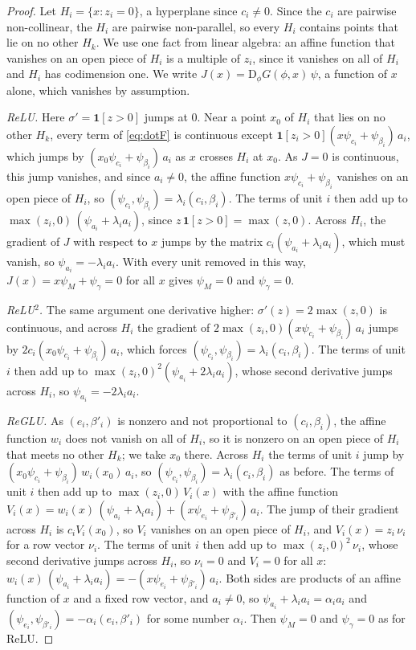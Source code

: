 \documentclass[10pt]{article}
\theoremstyle{definition}
\theoremstyle{remark}
\newcommand{\Der}{\mathrm{D}}
\begin{document}
\begin{proof}
Let $H_i = \{x : z_i = 0\}$, a hyperplane since $c_i \neq 0$. Since the $c_i$ are pairwise non-collinear, the $H_i$ are pairwise non-parallel, so every $H_i$ contains points that lie on no other $H_k$. We use one fact from linear algebra: an affine function that vanishes on an open piece of $H_i$ is a multiple of $z_i$, since it vanishes on all of $H_i$ and $H_i$ has codimension one. We write $J(x) = \Der_\phi G(\phi, x)\,\psi$, a function of $x$ alone, which vanishes by assumption.

\emph{ReLU.} Here $\sigma' = \mathbf 1[z > 0]$ jumps at $0$. Near a point $x_0$ of $H_i$ that lies on no other $H_k$, every term of \cref{eq:dotF} is continuous except $\mathbf 1[z_i > 0](x\psi_{c_i} + \psi_{\beta_i})\,a_i$, which jumps by $(x_0\psi_{c_i} + \psi_{\beta_i})\,a_i$ as $x$ crosses $H_i$ at $x_0$. As $J = 0$ is continuous, this jump vanishes, and since $a_i \neq 0$, the affine function $x\psi_{c_i} + \psi_{\beta_i}$ vanishes on an open piece of $H_i$, so $(\psi_{c_i}, \psi_{\beta_i}) = \lambda_i(c_i, \beta_i)$. The terms of unit $i$ then add up to $\max(z_i, 0)\,(\psi_{a_i} + \lambda_ia_i)$, since $z\,\mathbf 1[z > 0] = \max(z, 0)$. Across $H_i$, the gradient of $J$ with respect to $x$ jumps by the matrix $c_i(\psi_{a_i} + \lambda_ia_i)$, which must vanish, so $\psi_{a_i} = -\lambda_ia_i$. With every unit removed in this way, $J(x) = x\psi_M + \psi_\gamma = 0$ for all $x$ gives $\psi_M = 0$ and $\psi_\gamma = 0$.

\emph{ReLU$^2$.} The same argument one derivative higher: $\sigma'(z) = 2\max(z, 0)$ is continuous, and across $H_i$ the gradient of $2\max(z_i, 0)(x\psi_{c_i} + \psi_{\beta_i})\,a_i$ jumps by $2c_i(x_0\psi_{c_i} + \psi_{\beta_i})\,a_i$, which forces $(\psi_{c_i}, \psi_{\beta_i}) = \lambda_i(c_i, \beta_i)$. The terms of unit $i$ then add up to $\max(z_i, 0)^2(\psi_{a_i} + 2\lambda_ia_i)$, whose second derivative jumps across $H_i$, so $\psi_{a_i} = -2\lambda_ia_i$.

\emph{ReGLU.} As $(e_i, \beta'_i)$ is nonzero and not proportional to $(c_i, \beta_i)$, the affine function $w_i$ does not vanish on all of $H_i$, so it is nonzero on an open piece of $H_i$ that meets no other $H_k$; we take $x_0$ there. Across $H_i$ the terms of unit $i$ jump by $(x_0\psi_{c_i} + \psi_{\beta_i})\,w_i(x_0)\,a_i$, so $(\psi_{c_i}, \psi_{\beta_i}) = \lambda_i(c_i, \beta_i)$ as before. The terms of unit $i$ then add up to $\max(z_i, 0)\,V_i(x)$ with the affine function $V_i(x) = w_i(x)\,(\psi_{a_i} + \lambda_ia_i) + (x\psi_{e_i} + \psi_{\beta'_i})\,a_i$. The jump of their gradient across $H_i$ is $c_iV_i(x_0)$, so $V_i$ vanishes on an open piece of $H_i$, and $V_i(x) = z_i\,\nu_i$ for a row vector $\nu_i$. The terms of unit $i$ then add up to $\max(z_i, 0)^2\,\nu_i$, whose second derivative jumps across $H_i$, so $\nu_i = 0$ and $V_i = 0$ for all $x$: $w_i(x)\,(\psi_{a_i} + \lambda_ia_i) = -(x\psi_{e_i} + \psi_{\beta'_i})\,a_i$. Both sides are products of an affine function of $x$ and a fixed row vector, and $a_i \neq 0$, so $\psi_{a_i} + \lambda_ia_i = \alpha_ia_i$ and $(\psi_{e_i}, \psi_{\beta'_i}) = -\alpha_i(e_i, \beta'_i)$ for some number $\alpha_i$. Then $\psi_M = 0$ and $\psi_\gamma = 0$ as for ReLU.


\end{proof}
\end{document}
